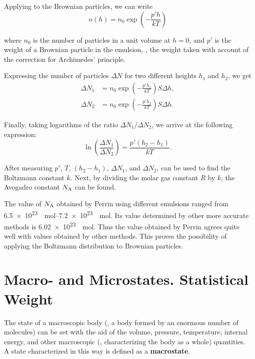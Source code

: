 Applying  to the Brownian particles, we can write
\begin{equation*}
	n(h) = n_0 \exp\left(-\frac{p' h}{kT}\right)
\end{equation*}

\noindent
where $n_0$ is the number of particles in a unit volume at $h=0$, and $p'$ is the weight of a Brownian particle in the emulsion, \ie, the weight taken with account of the correction for Archimedes' principle.

Expressing the number of particles $\Delta N$ for two different heights $h_1$ and $h_2$, we get
\begin{align*}
	\Delta N_1 &= n_0 \exp\left(-\frac{p' h_1}{kT}\right) S \Delta h,\\
	\Delta N_2 &= n_0 \exp\left(-\frac{p' h_2}{kT}\right) S \Delta h.
\end{align*}

\noindent
Finally, taking logarithms of the ratio $\Delta N_1/\Delta N_2$, we arrive at the following expression:
\begin{equation}\label{eq:11_83}
	\ln\left(\frac{\Delta N_1}{\Delta N_2}\right) = \frac{p' (h_2 - h_1)}{kT}.
\end{equation}

After measuring $p'$, $T$, $(h_2-h_1)$, $\Delta N_1$, and $\Delta N_2$,  can be used to find the Boltzmann constant $k$. Next, by dividing the molar gas constant $R$ by $k$, the Avogadro constant $N_{\text{A}}$ can be found.

The value of $N_{\text{A}}$ obtained by Perrin using different emulsions ranged from \SIrange{6.5e23}{7.2e23}{\per\mole}. Its value determined by other more accurate methods is \SI{6.02e23}{\per\mole}. Thus the value obtained by Perrin agrees quite well with values obtained by other methods. This proves the possibility of applying the Boltzmann distribution to Brownian particles.

\section{Macro- and Microstates. Statistical Weight}\label{sec:11_10}

The state of a macroscopic body (\ie, a body formed by an enormous number of molecules) can be set with the aid of the volume, pressure, temperature, internal energy, and other macroscopic (\ie, characterizing the body as a whole) quantities. A state characterized in this way is defined as a \textbf{macrostate}.

